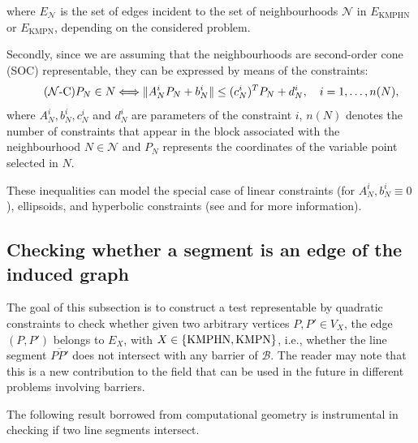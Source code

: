 \documentclass[a4paper,  review, authoryear, 1p.]{elsarticle}
\newcommand{\VX}{{V^{}_X}}
\newcommand{\EX}{{E^{}_X}}
\newcommand{\EN}{{E^{}_{\mathcal N}}}
\newcommand{\EKMPHN}{{E_{\text{KMPHN}}}}
\newcommand{\EKMPN}{{E_{\text{KMPN}}}}
\begin{document}
	where $\EN$ is the set of edges incident to the set of neighbourhoods $\mathcal N$ in $\EKMPHN$ or $\EKMPN$, depending on the considered problem.
	
	Secondly, since we are assuming that the neighbourhoods are second-order cone (SOC) representable, they can be expressed by means of the constraints:
	\begin{equation*}\tag{$\mathcal N$-C}\label{eq:nC}
		P_N\in N \Longleftrightarrow
		\|A_N^i P_N + b_N^i\| \leq (c_N^i)^T P_N + d_N^i,\quad i=1,\ldots,n(N), \\
	\end{equation*}
	where $A_N^i, b_N^i, c_N^i$ and $d_N^i$ are parameters of the constraint $i$, $n(N)$ denotes the number of constraints that appear in the block associated with the neighbourhood $N\in \mathcal N$ and $P_N$ represents the coordinates of the variable point selected in $N$. 
	
	These inequalities can model the special case of linear constraints (for $A_N^{i}, b_N^i\equiv 0$), ellipsoids, and hyperbolic constraints (see \citet{lobo1998} and \citet{boyd2004} for more information).
	
	\subsection{Checking whether a segment is an edge of the induced graph}
	
	The goal of this subsection is to construct  a test representable by quadratic constraints to check whether given two arbitrary vertices $P, P'\in \VX$, the edge $(P, P')$ belongs to $\EX$, with $X\in\{\rm KMPHN, \rm KMPN\}$, i.e., whether the line segment $\overline{PP'}$ does not intersect with any barrier of $\mathcal B$.  The reader may note that this is a new contribution to the field that can be used in the future in different problems involving barriers.
	
	The following result borrowed from computational geometry is instrumental in checking if two line segments intersect.
	
\end{document}
